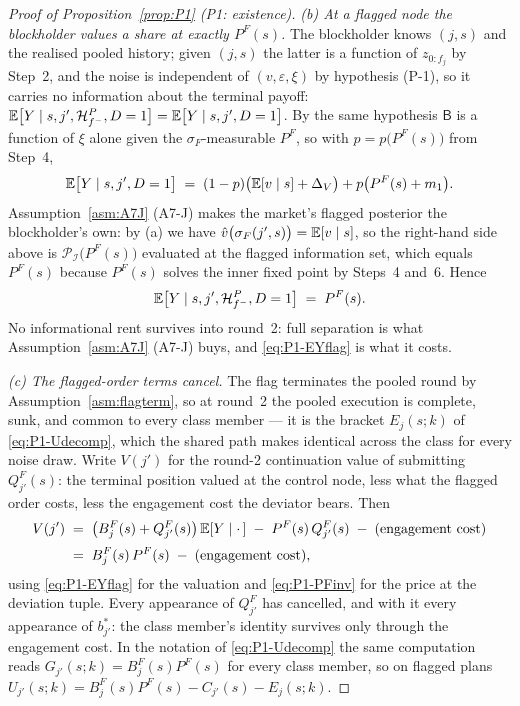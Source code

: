 \begin{proof}[Proof of Proposition~\ref{prop:P1} (P1: existence)]
\emph{(b) At a flagged node the blockholder values a share at exactly $P^F(s)$.} The blockholder
knows $(j,s)$ and the realised pooled history; given $(j,s)$ the latter is a function of
$z_{0:f_j}$ by Step~2, and the noise is independent of $(v,\varepsilon,\xi)$ by hypothesis (P-1), so
it carries no information about the terminal payoff:
$\mathbb{E}\bigl[Y \mid s,j',\mathcal H_{f^-}^P,D=1\bigr] = \mathbb{E}\bigl[Y \mid s,j',D=1\bigr]$. By the same
hypothesis $\mathsf B$ is a function of $\xi$ alone given the $\sigma_F$-measurable $P^F$, so with
$p = p\bigl(P^F(s)\bigr)$ from Step~4,
\[
\mathbb{E}\bigl[Y \mid s,j',D=1\bigr]
\;=\; (1-p)\bigl(\mathbb{E}[v \mid s] + \Delta_V\bigr) + p\bigl(P^F(s)+m_1\bigr).
\]
Assumption~\ref{asm:A7J} (A7-J) makes the market's flagged posterior the blockholder's own: by (a) we
have $\hat v\bigl(\sigma_F(j',s)\bigr) = \mathbb{E}[v \mid s]$, so the right-hand side above is
$\mathcal P_{\mathcal I}\bigl(P^F(s)\bigr)$ evaluated at the flagged information set, which equals
$P^F(s)$ because $P^F(s)$ solves the inner fixed point by Steps~4 and~6. Hence
\begin{equation}
\label{eq:P1-EYflag}
\mathbb{E}\bigl[Y \mid s,j',\mathcal H_{f^-}^P,D=1\bigr] \;=\; P^F(s).
\end{equation}
No informational rent survives into round~2: full separation is what Assumption~\ref{asm:A7J} (A7-J) buys,
and \eqref{eq:P1-EYflag} is what it costs.

\emph{(c) The flagged-order terms cancel.} The flag terminates the pooled round by
Assumption~\ref{asm:flagterm}, so at round~2 the pooled execution is complete, sunk, and common to
every class member --- it is the bracket $E_j(s;k)$ of \eqref{eq:P1-Udecomp}, which the shared path
makes identical across the class for every noise draw. Write $V(j')$ for the round-2 continuation
value of submitting $Q_{j'}^F(s)$: the terminal position valued at the control node, less what the
flagged order costs, less the engagement cost the deviator bears. Then
\begin{equation}
\label{eq:P1-Vcancel}
\begin{aligned}
V(j')
&\;=\; \bigl(B_j^F(s)+Q_{j'}^F(s)\bigr)\,\mathbb{E}[Y \mid \cdot\,]
\;-\; P^F(s)\,Q_{j'}^F(s) \;-\; (\text{engagement cost})\\[2pt]
&\;=\; B_j^F(s)\,P^F(s) \;-\; (\text{engagement cost}),
\end{aligned}
\end{equation}
using \eqref{eq:P1-EYflag} for the valuation and \eqref{eq:P1-PFinv} for the price at the deviation
tuple. Every appearance of $Q_{j'}^F$ has cancelled, and with it every appearance of $b_{j'}^*$: the
class member's identity survives only through the engagement cost. In the notation of
\eqref{eq:P1-Udecomp} the same computation reads $G_{j'}(s;k) = B_j^F(s)P^F(s)$ for every class
member, so on flagged plans $U_{j'}(s;k) = B_j^F(s)P^F(s) - C_{j'}(s) - E_j(s;k)$.


\end{proof}
